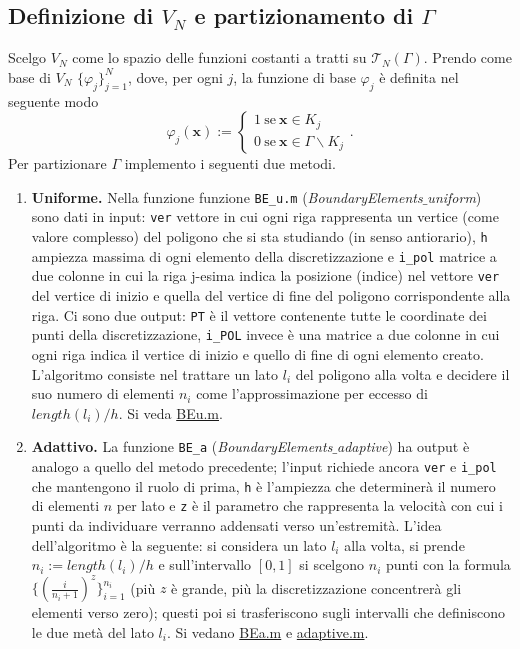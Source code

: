 \subsection{Definizione di $V_N$ e partizionamento di $\Gamma$}
Scelgo $V_N$ come lo spazio delle funzioni costanti a tratti su $\mathcal{T}_N(\Gamma)$. Prendo come base di $V_N$ $\{\varphi_j\}_{j=1}^N$, dove, per ogni $j$, la funzione di base $\varphi_j$ è definita nel seguente modo 
\[ \varphi_j(\textbf{x}) := \begin{cases}
	1 \ \text{se} \ \textbf{x}\in K_j \\ 0 \ \text{se} \ \textbf{x}\in \Gamma \backslash K_j
\end{cases}. \]
Per partizionare $\Gamma$ implemento i seguenti due metodi.
\begin{enumerate}
	\item \textbf{Uniforme.} Nella funzione funzione \verb|BE_u.m| (\textit{BoundaryElements$\_$uniform}) sono dati in input: \verb|ver| vettore in cui ogni riga rappresenta un vertice (come valore complesso) del poligono che si sta studiando (in senso antiorario), \verb|h| ampiezza massima di ogni elemento della discretizzazione e \verb|i_pol| matrice a due colonne in cui la riga j-esima indica la posizione (indice) nel vettore \verb|ver| del vertice di inizio e quella del vertice di fine del poligono corrispondente alla riga. Ci sono due output: \verb|PT| è il vettore contenente tutte le coordinate dei punti della discretizzazione, \verb|i_POL| invece è una matrice a due colonne in cui ogni riga indica il vertice di inizio e quello di fine di ogni elemento creato. L'algoritmo consiste nel trattare un lato $l_i$ del poligono alla volta e decidere il suo numero di elementi $n_i$ come l'approssimazione per eccesso di $length(l_i) / h$. Si veda \href{https://github.com/Daldossi/BEM/blob/main/BE_u.m}{BEu.m}.
	\item \textbf{Adattivo.} La funzione \verb|BE_a| (\textit{BoundaryElements$\_$adaptive}) ha output è analogo a quello del metodo precedente; l'input richiede ancora \verb|ver| e \verb|i_pol| che mantengono il ruolo di prima, \verb|h| è l'ampiezza che determinerà il numero di elementi $n$ per lato e \verb|z| è il parametro che rappresenta la velocità con cui i punti da individuare verranno addensati verso un'estremità. L'idea dell'algoritmo è la seguente: si considera un lato $l_i$ alla volta, si prende $n_i := length(l_i) / h$ e sull'intervallo $[0,1]$ si scelgono $n_i$ punti con la formula $\{ \left(\frac{i}{n_i+1}\right)^z \}_{i=1}^{n_i}$ (più $z$ è grande, più la discretizzazione concentrerà gli elementi verso zero); questi poi si trasferiscono sugli intervalli che definiscono le due metà del lato $l_i$. Si vedano \href{https://github.com/Daldossi/BEM/blob/main/BE_a.m}{BEa.m} e \href{https://github.com/Daldossi/BEM/blob/main/adaptive.m}{adaptive.m}.
\end{enumerate}
